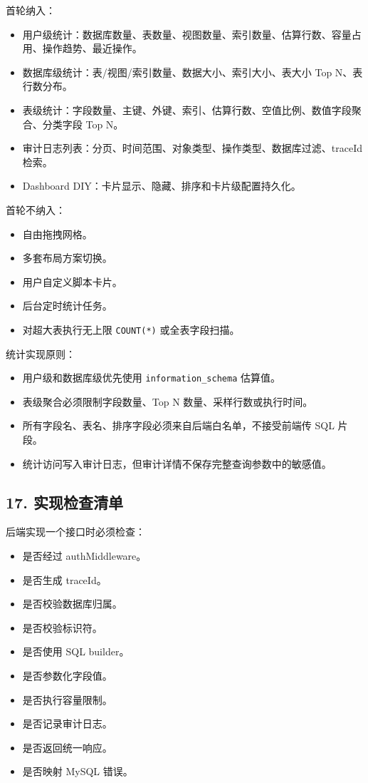 \documentclass[
  a4paper,
  UTF8]{ctexart}
\providecommand{\tightlist}{%
  \setlength{\itemsep}{0pt}\setlength{\parskip}{0pt}}
\begin{document}
首轮纳入：

\begin{itemize}
\tightlist
\item
  用户级统计：数据库数量、表数量、视图数量、索引数量、估算行数、容量占用、操作趋势、最近操作。
\item
  数据库级统计：表/视图/索引数量、数据大小、索引大小、表大小 Top
  N、表行数分布。
\item
  表级统计：字段数量、主键、外键、索引、估算行数、空值比例、数值字段聚合、分类字段
  Top N。
\item
  审计日志列表：分页、时间范围、对象类型、操作类型、数据库过滤、traceId
  检索。
\item
  Dashboard DIY：卡片显示、隐藏、排序和卡片级配置持久化。
\end{itemize}

首轮不纳入：

\begin{itemize}
\tightlist
\item
  自由拖拽网格。
\item
  多套布局方案切换。
\item
  用户自定义脚本卡片。
\item
  后台定时统计任务。
\item
  对超大表执行无上限 \texttt{COUNT(*)} 或全表字段扫描。
\end{itemize}

统计实现原则：

\begin{itemize}
\tightlist
\item
  用户级和数据库级优先使用 \texttt{information\_schema} 估算值。
\item
  表级聚合必须限制字段数量、Top N 数量、采样行数或执行时间。
\item
  所有字段名、表名、排序字段必须来自后端白名单，不接受前端传 SQL 片段。
\item
  统计访问写入审计日志，但审计详情不保存完整查询参数中的敏感值。
\end{itemize}

\hypertarget{ux5b9eux73b0ux68c0ux67e5ux6e05ux5355}{%
\subsection{17.
实现检查清单}\label{ux5b9eux73b0ux68c0ux67e5ux6e05ux5355}}

后端实现一个接口时必须检查：

\begin{itemize}
\tightlist
\item
  是否经过 authMiddleware。
\item
  是否生成 traceId。
\item
  是否校验数据库归属。
\item
  是否校验标识符。
\item
  是否使用 SQL builder。
\item
  是否参数化字段值。
\item
  是否执行容量限制。
\item
  是否记录审计日志。
\item
  是否返回统一响应。
\item
  是否映射 MySQL 错误。
\end{itemize}
\end{document}
